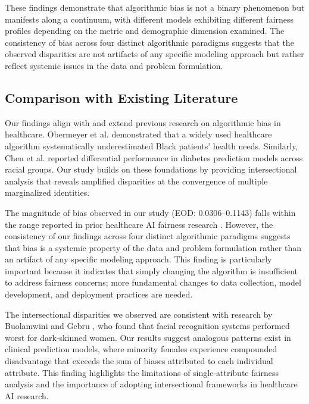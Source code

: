 These findings demonstrate that algorithmic bias is not a binary phenomenon 
but manifests along a continuum, with different models exhibiting different 
fairness profiles depending on the metric and demographic dimension examined. 
The consistency of bias across four distinct algorithmic paradigms suggests 
that the observed disparities are not artifacts of any specific modeling 
approach but rather reflect systemic issues in the data and problem 
formulation.

\subsection{Comparison with Existing Literature}

Our findings align with and extend previous research on algorithmic bias in 
healthcare. Obermeyer et al. \cite{obermeyer2019} demonstrated that a widely 
used healthcare algorithm systematically underestimated Black patients' health 
needs. Similarly, Chen et al. \cite{chen2019} reported differential 
performance in diabetes prediction models across racial groups. Our study 
builds on these foundations by providing intersectional analysis that reveals 
amplified disparities at the convergence of multiple marginalized identities.

The magnitude of bias observed in our study (EOD: 0.0306--0.1143) falls 
within the range reported in prior healthcare AI fairness research 
\cite{mehrabi2021}. However, the consistency of our findings across four 
distinct algorithmic paradigms suggests that bias is a systemic property 
of the data and problem formulation rather than an artifact of any specific 
modeling approach. This finding is particularly important because it 
indicates that simply changing the algorithm is insufficient to address 
fairness concerns; more fundamental changes to data collection, model 
development, and deployment practices are needed.

The intersectional disparities we observed are consistent with research by 
Buolamwini and Gebru \cite{buolamwini2018}, who found that facial recognition 
systems performed worst for dark-skinned women. Our results suggest analogous 
patterns exist in clinical prediction models, where minority females experience 
compounded disadvantage that exceeds the sum of biases attributed to each 
individual attribute. This finding highlights the limitations of single-attribute 
fairness analysis and the importance of adopting intersectional frameworks 
in healthcare AI research.

